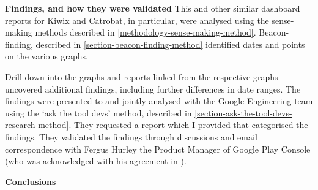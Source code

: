 \textbf{Findings, and how they were validated}
This and other similar dashboard reports for Kiwix and Catrobat, in particular, were analysed using the sense-making methods described in \ref{methodology-sense-making-method}. Beacon-finding, described in \ref{section-beacon-finding-method} identified dates and points on the various graphs. 


Drill-down into the graphs and reports linked from the respective graphs uncovered additional findings, including further differences in date ranges. The findings were presented to and jointly analysed with the Google Engineering team using the `ask the tool devs' method, described in \ref{section-ask-the-tool-devs-research-method}. They requested a report which I provided that categorised the findings. They validated the findings through discussions and email correspondence with Fergus Hurley the Product Manager of Google Play Console (who was acknowledged with his agreement in ).

\textbf{Conclusions}